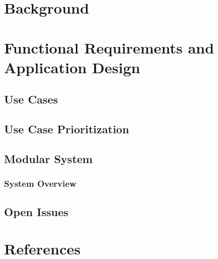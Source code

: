 \documentclass[a4paper,12pt]{article}
\begin{document}
	\section{Background}	
	
	
	
	\section{Functional Requirements and Application Design}
	
	
		\subsection{Use Cases}
		
		
		\subsection{Use Case Prioritization}
		
		
		\subsection{Modular System}
		
			\subsubsection{System Overview}
			
			
	
		\subsection{Open Issues}
		
	
	
	\section{References}
	
	
	
\end{document}
